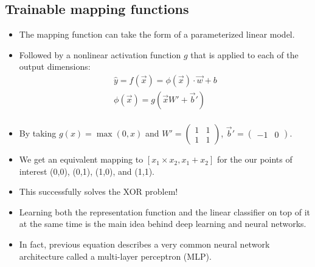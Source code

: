 \subsection{Trainable mapping functions}
\begin{itemize}
\item The mapping function can take the form of a parameterized linear model.
\item Followed by a nonlinear activation function $g$ that is applied to each of the output dimensions:
\begin{equation}
\begin{split}
\hat{y} = f(\vec{x}) = \phi(\vec{x}) \cdot \vec{w} +b \\
\phi(\vec{x}) = g(\vec{x}W'+ \vec{b}') \\
\end{split} 
\end{equation}
\item By taking $g(x) = \operatorname{max}(0, x)$ and $W' = \begin{pmatrix}
    1 & 1 \\ 1 & 1 \end{pmatrix}$, $\vec{b}' = \begin{pmatrix}
    -1 & 0 \end{pmatrix}$.
\item We get an equivalent mapping to $[x_1 \times x_2, x_1 + x_2]$  for the our points of interest (0,0), (0,1), (1,0), and (1,1).
\item This successfully solves the XOR problem!
\item Learning both the representation function and the linear classifier on top of it at the same time is the main idea behind deep learning and neural networks.
\item In fact, previous equation describes a very common neural network architecture called a multi-layer perceptron (MLP).
\end{itemize}
